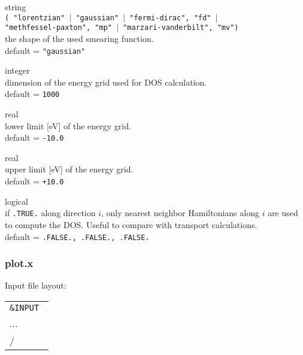 {\noindent{}%
{\sc string} \\ {\tt ( "lorentzian" $\mid$ "gaussian" $\mid$ "fermi-dirac", "fd" $\mid$  \\
                "methfessel-paxton", "mp" $\mid$ "marzari-vanderbilt", "mv") } \\
                the shape of the used smearing function. \\
{\sc default} = {\tt "gaussian"} \par

\noindent{}%
{\sc integer} \\ dimension of the energy grid used for DOS calculation. \\
{\sc default} = {\tt 1000}\par

\noindent{}%
{\sc real} \\ lower limit [eV] of the energy grid. \\
{\sc default} = {\tt -10.0} \par

\noindent{}%
{\sc real} \\ upper limit [eV] of the energy grid. \\
{\sc default} = {\tt +10.0} \par

\noindent{}%
{\sc logical} \\ if {\tt .TRUE.} along direction $i$, only nearest neighbor
                 Hamiltonians along $i$ are used to compute the DOS. Useful to compare with 
                 transport calculations. \\
{\sc default} = {\tt .FALSE., .FALSE., .FALSE.} \par

}\bigskip


\subsubsection{plot.x}
\noindent Input file layout: \\

%
%
\begin{tabular}{l}
  {\tt \&INPUT } \\
  ... \\
  / \\
\end{tabular}
%
%
\\

